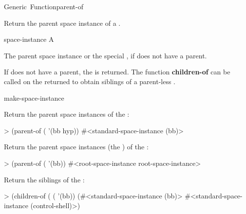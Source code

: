 \documentclass[10pt,twoside,english,pdftex]{article}
\begin{document}
\begin{functiondoc}{Generic~Function}{parent-of}%
  {
    \returns{} }
%

\fnsyntax

\fnpurpose Return the parent space instance of a .

\fnmethods
{}%
  {\code{(} 
    \returns{} }

\fnpackage {}

\fnmodule {}

\fnargs
\begin{args}{space-instance}
 A 
\end{args}

\fnreturns The parent space instance or the special
, if  does not have a
parent.

\fndescription If  does not have a parent, the
 is returned.  The function
\textbf{children-of} can be called on the returned
 to obtain siblings of a parent-less
.

\begin{alsos}{make-space-instance}
\also[children-of]
\end{alsos}

\fnexamples
{}%
%
Return the parent space instances of the  
:
\begin{example}
> (parent-of ( '(bb hyp))
#<standard-space-instance (bb)>
\end{example}

Return the parent space instances (the ) of
the  :
\begin{example}
> (parent-of ( '(bb))
#<root-space-instance root-space-instance>
\end{example}

Return the siblings of the  :
\begin{example}
> (children-of
    ( ( '(bb))
(#<standard-space-instance (bb)>
 #<standard-space-instance (control-shell)>)
\end{example}

\end{functiondoc}
\end{document}
